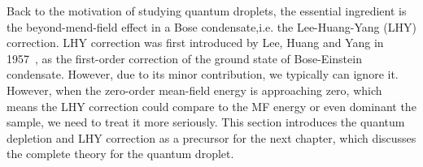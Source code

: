 Back to the motivation of studying quantum droplets, the essential ingredient is the beyond-mend-field effect in a Bose condensate,i.e. the Lee-Huang-Yang (LHY) correction. LHY correction was first introduced by Lee, Huang and Yang in 1957~\cite{lee1957}, as the first-order correction of the ground state of Bose-Einstein condensate. However, due to its minor contribution, we typically can ignore it. However, when the zero-order mean-field energy is approaching zero, which means the LHY correction could compare to the MF energy or even dominant the sample, we need to treat it more seriously. This section introduces the quantum depletion and LHY correction as a precursor for the next chapter, which discusses the complete theory for the quantum droplet.

